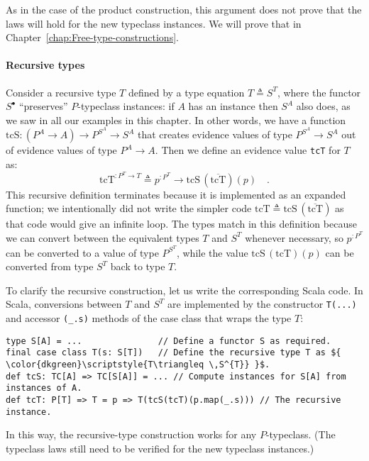 As in the case of the product construction, this argument does not
prove that the laws will hold for the new typeclass instances. We
will prove that in Chapter~\ref{chap:Free-type-constructions}.

\paragraph{Recursive types}

Consider a recursive type $T$ defined by a type equation $T\triangleq S^{T}$,
where the functor $S^{\bullet}$ \textsf{``}preserves\textsf{''} $P$-typeclass instances:
if $A$ has an instance then $S^{A}$ also does, as we saw in all
our examples in this chapter. In other words, we have a function $\text{tcS}:(P^{A}\rightarrow A)\rightarrow P^{S^{A}}\rightarrow S^{A}$
that creates evidence values of type $P^{S^{A}}\rightarrow S^{A}$
out of evidence values of type $P^{A}\rightarrow A$. Then we define
an evidence value \lstinline!tcT! for $T$ as:
\[
\text{tcT}^{:P^{T}\rightarrow T}\triangleq p^{:P^{T}}\rightarrow\text{tcS}\,(\overline{\text{tcT}})(p)\quad.
\]
This recursive definition terminates because it is implemented as
an expanded function; we intentionally did not write the simpler code
$\text{tcT}\triangleq\text{tcS}\,(\overline{\text{tcT}})$ as that
code would give an infinite loop. The types match in this definition
because we can convert between the equivalent types $T$ and $S^{T}$
whenever necessary, so $p^{:P^{T}}$ can be converted to a value of
type $P^{S^{T}}$, while the value $\text{tcS}\,(\text{tcT})(p)$
can be converted from type $S^{T}$ back to type $T$.

To clarify the recursive construction, let us write the corresponding
Scala code. In Scala, conversions between $T$ and $S^{T}$ are implemented
by the constructor \lstinline!T(...)! and accessor \lstinline!(_.s)!
methods of the case class that wraps the type $T$:
\begin{lstlisting}[mathescape=true]
type S[A] = ...               // Define a functor S as required.
final case class T(s: S[T])   // Define the recursive type T as ${ \color{dkgreen}\scriptstyle{T\triangleq \,S^{T}} }$.
def tcS: TC[A] => TC[S[A]] = ... // Compute instances for S[A] from instances of A.
def tcT: P[T] => T = p => T(tcS(tcT)(p.map(_.s))) // The recursive instance.
\end{lstlisting}
In this way, the recursive-type construction works for any $P$-typeclass.
(The typeclass laws still need to be verified for the new typeclass
instances.)

